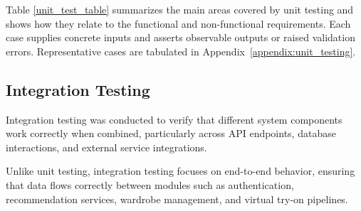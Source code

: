 Table \ref{unit_test_table} summarizes the main areas covered by unit testing and shows how they relate to the functional and non-functional requirements. Each case supplies concrete inputs and asserts observable outputs or raised validation errors. Representative cases are tabulated in Appendix~\ref{appendix:unit_testing}.


\subsection{Integration Testing}
Integration testing was conducted to verify that different system components work correctly when combined, particularly across API endpoints, database interactions, and external service integrations.

Unlike unit testing, integration testing focuses on end-to-end behavior, ensuring that data flows correctly between modules such as authentication, recommendation services, wardrobe management, and virtual try-on pipelines.

